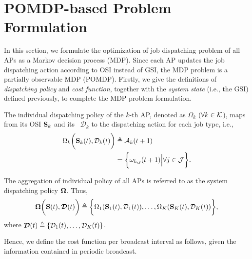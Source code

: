 \section{POMDP-based Problem Formulation}
\label{sec:formulation}
In this section, we formulate the optimization of job dispatching problem of all APs as a Markov decision process (MDP).
Since each AP updates the job dispatching action according to OSI instead of GSI, the MDP problem is a partially observable MDP (POMDP).
Firstly, we give the definitions of \emph{dispatching policy} and \emph{cost function}, together with the \emph{system state} (i.e., the GSI) defined previously, to complete the MDP problem formulation.

\begin{definition}
    The individual dispatching policy of the $k$-th AP, denoted as $\Omega_{k}$ ($\forall k \in\mathcal{K}$), maps from its OSI $\mathbf{S}_{k}$ and its \brlatency~$\mathcal{D}_{k}$ to the dispatching action for each job type, i.e.,
    \begin{align}
        \Omega_{k} \bigg( \mathbf{S}_{k}(t), \mathcal{D}_{k}(t) \bigg)
        &\triangleq \mathcal{A}_{k}(t+1)
        \nonumber\\
        &= \bigg\{
            \omega_{k,j}(t+1) \Big| \forall j\in\mathcal{J}
        \bigg\}.
        \label{def:action}
    \end{align}

    The aggregation of individual policy of all APs is referred to as the system dispatching policy $\boldsymbol{\Omega}$.
    Thus,
    {\small
    \begin{align}
        \boldsymbol{\Omega}\bigg( \mathbf{S}(t), \boldsymbol{\mathcal{D}}(t) \bigg) \triangleq \bigg\{
            \Omega_{1}(\mathbf{S}_{1}(t), \mathcal{D}_{1}(t)), \dots, \Omega_{K}(\mathbf{S}_{K}(t),\mathcal{D}_{K}(t))
        \bigg\},
    \end{align}
    }
    where $\boldsymbol{\mathcal{D}}(t) \triangleq \{ \mathcal{D}_{1}(t), \dots, \mathcal{D}_{K}(t) \}$.
\end{definition}

%
Hence, we define the cost function per broadcast interval as follows, {given the information contained in periodic broadcast.}

